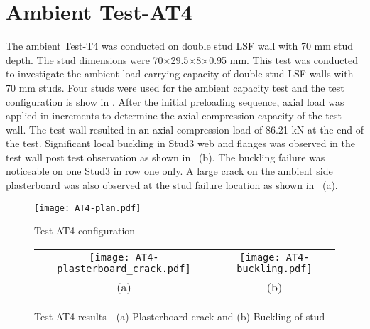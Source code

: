 \section{Ambient Test-AT4}

The ambient Test-T4 was conducted on double stud LSF wall with 70 mm stud depth. The stud dimensions were 70\(\times\)29.5\(\times\)8\(\times\)0.95 mm. This test was conducted to investigate the ambient load carrying capacity of double stud LSF walls with 70 mm studs. Four studs were used for the ambient capacity test and the test configuration is show in . After the initial preloading sequence, axial load was applied in increments to determine the axial compression capacity of the test wall. The test wall resulted in an axial compression load of 86.21 kN at the end of the test. Significant local buckling in Stud3 web and flanges was observed in the test wall post test observation as shown in ~(b). The buckling failure was noticeable on one Stud3 in row one only. A large crack on the ambient side plasterboard was also observed at the stud failure location as shown in ~(a).
\begin{figure}[!htbp]
	\centering
			\texttt{[image: AT4-plan.pdf]}\\
		\caption{Test-AT4 configuration}
		\label{fig:AT4-plan}
\end{figure}  
\begin{figure}[!htbp]
	\centering
		\begin{tabular}{cc}
			\texttt{[image: AT4-plasterboard\_crack.pdf]} & \texttt{[image: AT4-buckling.pdf]} \\ 
			(a) & (b)  \\ 
		\end{tabular} 
		\caption{Test-AT4 results - (a) Plasterboard crack and (b) Buckling of stud}
		\label{fig:AT4-failure}
\end{figure}

